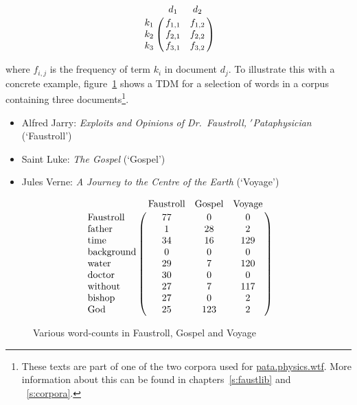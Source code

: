\begin{equation}
  \bbordermatrix{~ & d_1 & d_2 \cr
        k_1 & f_{1,1} & f_{1,2} \cr
        k_2 & f_{2,1} & f_{2,2} \cr
        k_3 & f_{3,1} & f_{3,2}}
\label{eq:tdm}
\end{equation}

where $f_{i,j}$ is the frequency of term $k_{i}$ in document $d_{j}$. To illustrate this with a concrete example, figure~\ref{fig:termdocs} shows a \ac{TDM} for a selection of words in a corpus containing three documents\footnote{These texts are part of one of the two corpora used for \url{pata.physics.wtf}. More information about this can be found in chapters~\ref{s:faustlib} and ~\ref{s:corpora}.}.

\begin{itemize}
  \item Alfred Jarry: \textit{Exploits and Opinions of Dr.\ Faustroll, $'$Pataphysician} (`Faustroll') \citeyear{Jarry1996}
  \item Saint Luke: \textit{The Gospel} (`Gospel') \citeyear{Luke2005}
  \item Jules Verne: \textit{A Journey to the Centre of the Earth} (`Voyage') \citeyear{Verne2010}
\end{itemize}

\begin{figure}[!htbp]
\[
  \bbordermatrix{
    ~                  & \text{Faustroll} & \text{Gospel} & \text{Voyage} \cr
    \text{Faustroll}   & 77               & 0             & 0             \cr
    \text{father}      & 1                & 28            & 2             \cr
    \text{time}        & 34               & 16            & 129           \cr
    \text{background}  & 0                & 0             & 0             \cr
    \text{water}       & 29               & 7             & 120           \cr
    \text{doctor}      & 30               & 0             & 0             \cr
    \text{without}     & 27               & 7             & 117           \cr
    \text{bishop}      & 27               & 0             & 2             \cr
    \text{God}         & 25               & 123           & 2
  }
\]
\caption[Various word-counts]{Various word-counts in Faustroll, Gospel and Voyage}
\label{fig:termdocs}
\end{figure}


